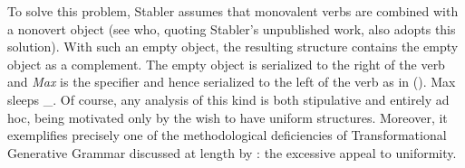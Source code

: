\eal
{}
\zl
To solve this problem, Stabler assumes that monovalent verbs are combined with a nonovert object
(see \citet[, 124]{Veenstra98a} who, quoting Stabler's unpublished work, also adopts this solution). With such an empty object, the resulting structure
contains the empty object as a complement. The empty object is serialized to the right of the verb
and \emph{Max} is the specifier and hence serialized to the left of the verb as in ().
\ea
\label{Beispiel-leeres-Element-intransitive-Verben}
Max sleeps \_.
\z
Of course, any analysis of this kind is both stipulative and
entirely ad hoc, being motivated only by the wish to have uniform
structures. Moreover, it exemplifies precisely one of the
methodological deficiencies of Transformational Generative Grammar discussed at length by
\citet[Section~2.1.2]{CJ2005a}: the excessive appeal to uniformity.

